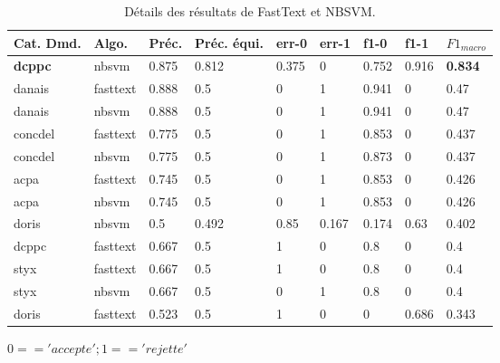  \begin{table}[htb]
 	\scriptsize
 	\begin{tabular}{|l|l|l|l|l|l|l|l|l|}
 		\hline
 	\textbf{Cat. Dmd.} & \textbf{Algo.} & \textbf{Préc.}   & \textbf{Préc. équi.} & \textbf{err-0} & \textbf{err-1} & \textbf{f1-0}  & \textbf{f1-1}  & \textbf{$F1_{macro}$} \\ \hline
 	\textbf{dcppc}       & nbsvm      & 0.875 & 0.812        & 0.375 & 0     & 0.752 & 0.916 & \textbf{0.834}        \\ \hline
 	danais      & fasttext   & 0.888 & 0.5          & 0     & 1     & 0.941    & 0 & 0.47         \\ \hline
 	danais      & nbsvm      & 0.888 & 0.5          & 0     & 1     & 0.941 & 0     & 0.47         \\ \hline
 	concdel     & fasttext   & 0.775 & 0.5          & 0     & 1     & 0.853     & 0 & 0.437        \\ \hline
 	concdel     & nbsvm      & 0.775 & 0.5          & 0     & 1     & 0.873 & 0     & 0.437        \\ \hline
 	acpa        & fasttext   & 0.745 & 0.5          & 0     & 1     & 0.853     & 0 & 0.426        \\ \hline
 	acpa        & nbsvm      & 0.745 & 0.5          & 0     & 1     & 0.853 & 0     & 0.426        \\ \hline
 	doris       & nbsvm      & 0.5   & 0.492        & 0.85  & 0.167 & 0.174 & 0.63  & 0.402        \\ \hline
 	dcppc       & fasttext   & 0.667 & 0.5          & 1     & 0     & 0.8   & 0     & 0.4          \\ \hline
 	styx        & fasttext   & 0.667 & 0.5          & 1     & 0     & 0.8     & 0   & 0.4          \\ \hline
 	styx        & nbsvm      & 0.667 & 0.5          & 0     & 1     & 0.8   & 0     & 0.4          \\ \hline
 	doris & fasttext & 0.523 & 0.5 & 1 & 0 & 0 & 0.686 & 0.343 \\ \hline
 	\end{tabular}
 	
 $0 == 'accepte'; 1 == 'rejette'$

\caption{Détails des résultats de FastText et NBSVM.}\label{tab:sensrst:fasttextnbsvm}
 \end{table}

